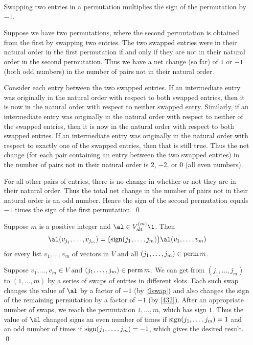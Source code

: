 {Swapping two entries in a permutation multiplies the sign of the permutation by\/~$-1$.}

\proof
Suppose we have two permutations, where the second permutation is obtained from the first by swapping two entries.  The two swapped entries were in their natural order in the first permutation if and only if they are not in their natural order in the second permutation. Thus we have a net change (so far) of $1$ or $-1$ (both odd numbers) in the number of pairs not in their natural order.

Consider each entry between the two swapped entries.  If an intermediate entry was originally in the natural order with respect to both swapped entries, then it is now in the natural order with respect to neither swapped entry.  Similarly, if an intermediate entry was originally in the natural order with respect to neither of the swapped entries, then it is now in the natural order with respect to both swapped entries. If an intermediate entry was originally in the natural order with respect to exactly one of the swapped entries, then that is still true. Thus the net change (for each pair containing an entry between the two swapped entries) in the number of pairs not in their natural order is $2$, $-2$, or $0$ (all even numbers).

For all other pairs of entries, there is no change in whether or not they are in their natural order.  Thus the total net change in the number of pairs not in their natural order is an odd number. Hence the sign of the second permutation equals $-1$ times the sign of the first permutation.
\qed

\pagebreak[3]

{Suppose $m$ is a positive integer and $\al \in V_{\text{alt}}^{(m)}\1$. Then
\[
\al(v_{j_1}, \ldots, v_{j_m}) = \paren[\big]{ \sign(j_1, \ldots, j_m) } \al(v_1, \ldots, v_m)
\]
for every list $v_1, \ldots, v_m$ of vectors in $V$ and all $(j_1, \ldots, j_m) \in \operatorname{perm} m$.}

\proof
Suppose $v_1, \ldots, v_m \in V$ and $(j_1, \ldots, j_m) \in \operatorname{perm} m$. We can get from $(j_1, \ldots, j_m)$ to $(1, \ldots, m)$ by a series of swaps of entries in different slots. Each such swap changes the value of $\al$ by a factor of $-1$ (by \ref{9swap}) and also changes the sign of the remaining permutation by a factor of $-1$ (by \ref{432}). After an appropriate number of swaps, we reach the permutation
$1, \ldots, m$, which has sign $1$.
Thus the value of $\al$ changed signs an even number of times if $\operatorname{sign}(j_1, \ldots, j_m) = 1$ and an odd number of times if $\operatorname{sign}(j_1, \ldots, j_m) = -1$, which gives the desired result.
\qed

